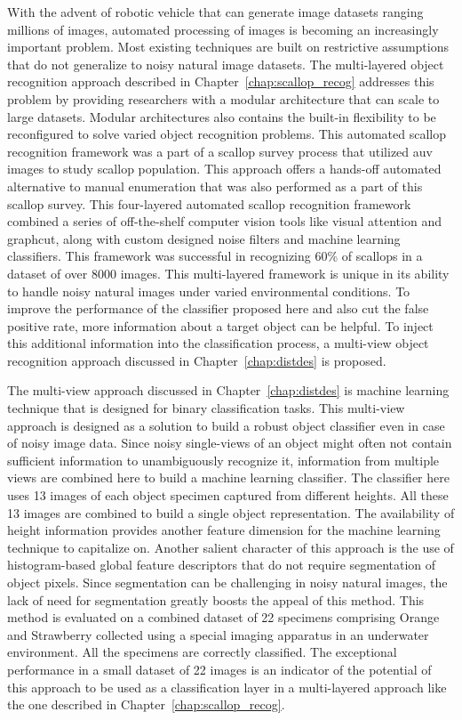 With the advent of robotic vehicle that can generate image datasets ranging millions of images, automated processing of images is becoming an increasingly important problem. Most existing techniques are built on restrictive assumptions that do not generalize to noisy natural image datasets. The multi-layered object recognition approach described in Chapter~\ref{chap:scallop_recog} addresses this problem
by providing researchers with a modular architecture that can scale to large datasets. Modular architectures also contains the built-in flexibility to be reconfigured to solve varied object recognition problems.
This automated scallop recognition framework was a part of a scallop survey process that utilized \gls{auv} images to study scallop population. This approach offers a hands-off automated alternative to manual enumeration that was also performed as a part of this scallop survey.
This four-layered automated scallop recognition framework combined a series of off-the-shelf computer vision tools like visual attention and graphcut, 
along with custom designed noise filters and machine learning classifiers.
This framework was successful in recognizing 60\% of scallops in a dataset of over 8000 images.
This multi-layered framework is unique in its ability to handle noisy natural images under varied environmental conditions.
To improve the performance of the classifier proposed here and also cut the false positive rate, more information about a target object can be helpful.
To inject this additional information into the classification process, a multi-view object recognition approach discussed in Chapter~\ref{chap:distdes} is proposed.

The multi-view approach discussed in Chapter~\ref{chap:distdes} is machine learning technique that is designed for binary classification tasks. 
This multi-view approach is designed as a solution to build a robust object classifier even in case of noisy image data.
Since noisy single-views of an object might often not contain sufficient information to unambiguously recognize it, information from multiple views are combined 
here to build a machine learning classifier. The classifier here uses 13 images of each object specimen captured from different heights.
All these 13 images are combined to build a single object representation.
The availability of height information provides another feature dimension for the machine learning technique to capitalize on.
Another salient character of this approach is the use of histogram-based global feature descriptors that do not
require segmentation of object pixels. Since segmentation can be challenging in noisy natural images, the lack of need for segmentation greatly boosts the appeal of this method. This method is evaluated on a combined dataset of 22 specimens comprising Orange and Strawberry collected using a special imaging apparatus in an underwater environment.
All the specimens are correctly classified. The exceptional performance in a small dataset of 22 images is an indicator of the potential of this approach to be used as a classification layer in a multi-layered approach like the one described in Chapter~\ref{chap:scallop_recog}.

